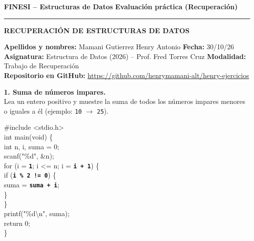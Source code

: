 \documentclass[10pt, a4paper]{article}
\newcommand{\codigoResaltado}[1]{\colorbox{fondoresaltado}{\textbf{\color{verdecompletado}\texttt{#1}}}}
\begin{document}
\noindent
{\small\textbf{FINESI -- Estructuras de Datos} \hfill \textbf{Evaluación práctica (Recuperación)}}
\vspace{1mm}\hrule\vspace{2mm}

\begin{center}
{\large\textbf{RECUPERACIÓN DE ESTRUCTURAS DE DATOS}}
\end{center}
\vspace{1mm}

\begin{tcolorbox}[colback=fondocaja, colframe=black!30, arc=1mm, boxrule=0.5pt, top=1.5mm, bottom=1.5mm]
\small
\textbf{Apellidos y nombres:} Mamani Gutierrez Henry Antonio \hfill \textbf{Fecha:} 30/10/26\\
\textbf{Asignatura:} Estructura de Datos (2026) -- Prof. Fred Torres Cruz \hfill \textbf{Modalidad:} Trabajo de Recuperación\\[1mm]
\textbf{Repositorio en GitHub:} \url{https://github.com/henrymamani-alt/henry-ejercicios}
\end{tcolorbox}
\vspace{1mm}

\noindent\textbf{\large 1. Suma de números impares.}\\
{\small Lea un entero positivo y muestre la suma de todos los números impares menores o iguales a él (ejemplo: \texttt{10} $\rightarrow$ \texttt{25}).}

\vspace{1.5mm}
\begin{tcolorbox}[colback=fondocodigo, colframe=azulborde, leftrule=2mm, arc=1mm, boxrule=0.5pt, top=1.5mm, bottom=1.5mm]
\small\ttfamily
\#include <stdio.h>\\[1mm]
int main(void) \{\\
\hspace*{4mm}int n, i, suma = 0;\\
\hspace*{4mm}scanf("\%d", \&n);\\
\hspace*{4mm}for (i = \codigoResaltado{1}; i <= n; i = \codigoResaltado{i + 1}) \{\\
\hspace*{8mm}if (\codigoResaltado{i \% 2 != 0}) \{\\
\hspace*{12mm}suma = \codigoResaltado{suma + i};\\
\hspace*{8mm}\}\\
\hspace*{4mm}\}\\
\hspace*{4mm}printf("\%d\textbackslash n", suma);\\
\hspace*{4mm}return 0;\\
\}
\end{tcolorbox}
\end{document}
